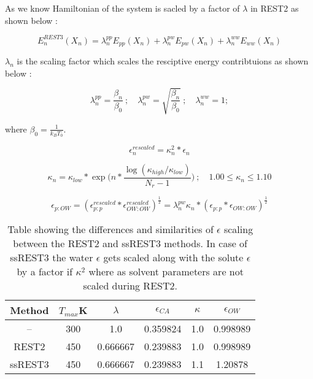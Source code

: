 \documentclass{book}
\begin{document}
As we know Hamiltonian of the system is sacled by a factor of $\lambda$ in REST2 as shown below :

\begin{center}
    \begin{equation}
        E_{n}^{REST3}(X_{n}) = \lambda_{n}^{pp} E_{pp}(X_{n}) + \lambda_{n}^{pw} E_{pw}(X_{n}) + \lambda_{n}^{ww} E_{ww} (X_{n})
    \end{equation}
\end{center}

$\lambda_{n}$ is the scaling factor which scales the resciptive energy contribtuions as shown below :  
\begin{center}
    \begin{equation}
        \lambda_{n}^{pp}=\frac{\beta_{n}}{\beta_{0}} \ ; \quad \lambda_{n}^{pw}=\sqrt{\frac{\beta_{n}}{\beta_{0}}} \ ; \quad \lambda_{n}^{ww}=1;        
    \end{equation}
\end{center}

where $\beta_{0}=\frac{1}{k_{B}T_{0}}$.

\begin{center}
    \begin{equation}
        \epsilon_{n}^{rescaled} = \kappa_{n}^{2} * \epsilon_{n}
    \end{equation}
\end{center}

\begin{center}
    \begin{equation}
        \kappa_{n}=\kappa_{low}*\exp{ \biggl(n*\frac{\log(\kappa_{high}/\kappa_{low})}{N_{r}-1}\biggr)} \ ; \quad 1.00 \leq \kappa_{n} \leq 1.10
    \end{equation}
\end{center}

\begin{center}
    \begin{equation}
        \epsilon_{p:OW}=(\epsilon_{p:p}^{rescaled} * \epsilon_{OW:OW}^{rescaled})^{\frac{1}{2}}=\lambda_{n}^{pw}\kappa_{n}*(\epsilon_{p:p} * \epsilon_{OW:OW})^{\frac{1}{2}}
    \end{equation}
\end{center}

\begin{table}[h!]
\centering
\begin{tabular}{|c|c|c|c|c|c|}
\hline
Method & $T_{max}$K & $\lambda$ & $\epsilon_{CA}$ & $\kappa$ & $\epsilon_{OW}$ \\
\hline
-- & 300 & 1.0 & 0.359824 & 1.0 & 0.998989 \\
\hline
REST2 & 450 & 0.666667 & 0.239883 & 1.0 & 0.998989 \\
\hline
ssREST3 & 450 & 0.666667 & 0.239883 & 1.1 & 1.20878 \\

\hline
\end{tabular}
\caption{Table showing the differences and similarities of $\epsilon$ scaling between the REST2 and ssREST3 methods. In case of ssREST3 the 
water $\epsilon$ gets scaled along with the solute $\epsilon$ by a factor if $\kappa^{2}$ where as solvent parameters are not scaled during REST2.}
\label{tab:eps_table}
\end{table}
\end{document}
